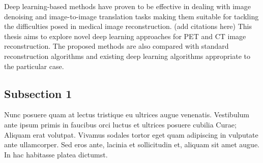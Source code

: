 Deep learning-based methods have proven to be effective in dealing with image denoising and image-to-image translation tasks making them suitable for tackling the difficulties posed in medical image reconstruction. (add citations here) This thesis aims to explore novel deep learning approaches for \ac{PET} and \ac{CT} image reconstruction. The proposed methods are also compared with standard reconstruction algorithms and existing deep learning algorithms appropriate to the particular case. 

\subsection{Subsection 1}

Nunc posuere quam at lectus tristique eu ultrices augue venenatis. Vestibulum ante ipsum primis in faucibus orci luctus et ultrices posuere cubilia Curae; Aliquam erat volutpat. Vivamus sodales tortor eget quam adipiscing in vulputate ante ullamcorper. Sed eros ante, lacinia et sollicitudin et, aliquam sit amet augue. In hac habitasse platea dictumst.


